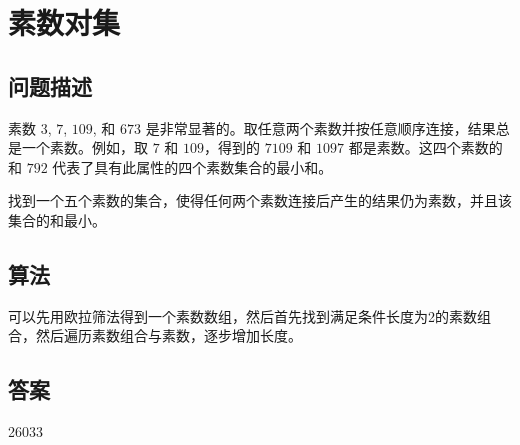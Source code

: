 \section{素数对集}
\subsection{问题描述}
\begin{tcolorbox}
素数 $3$, $7$, $109$, 和 $673$ 是非常显著的。取任意两个素数并按任意顺序连接，结果总是一个素数。例如，取 $7$ 和 $109$，得到的 $7109$ 和 $1097$ 都是素数。这四个素数的和 $792$ 代表了具有此属性的四个素数集合的最小和。

找到一个五个素数的集合，使得任何两个素数连接后产生的结果仍为素数，并且该集合的和最小。
\end{tcolorbox}

\subsection{算法}
可以先用欧拉筛法得到一个素数数组，然后首先找到满足条件长度为2的素数组合，然后遍历素数组合与素数，逐步增加长度。

\subsection{答案}
26033
